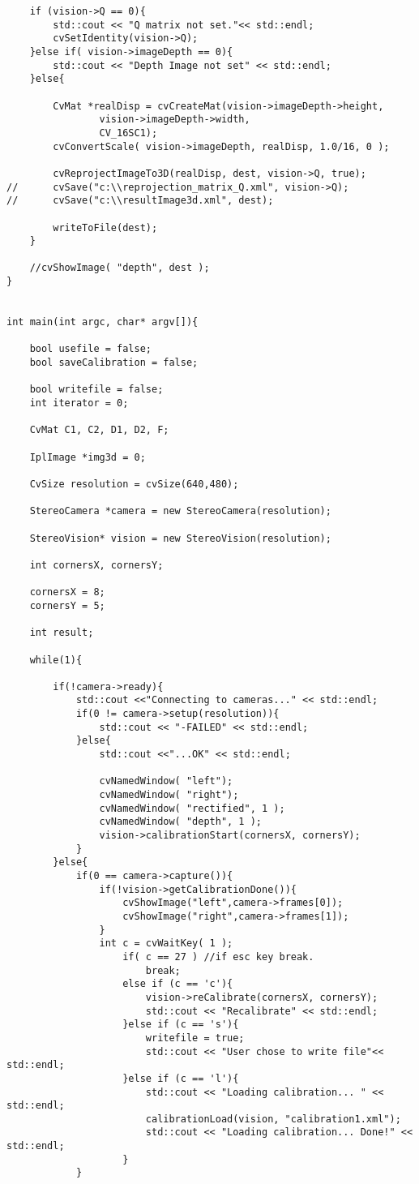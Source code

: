 \begin{lstlisting}
	if (vision->Q == 0){
		std::cout << "Q matrix not set."<< std::endl;
		cvSetIdentity(vision->Q);
	}else if( vision->imageDepth == 0){
		std::cout << "Depth Image not set" << std::endl;
	}else{

		CvMat *realDisp = cvCreateMat(vision->imageDepth->height,
				vision->imageDepth->width,
				CV_16SC1);
		cvConvertScale( vision->imageDepth, realDisp, 1.0/16, 0 );

		cvReprojectImageTo3D(realDisp, dest, vision->Q, true);
//		cvSave("c:\\reprojection_matrix_Q.xml", vision->Q);
//		cvSave("c:\\resultImage3d.xml", dest);

		writeToFile(dest);
	}

	//cvShowImage( "depth", dest );
}


int main(int argc, char* argv[]){

	bool usefile = false;
	bool saveCalibration = false;

	bool writefile = false;
	int iterator = 0;

	CvMat C1, C2, D1, D2, F;

	IplImage *img3d = 0;

	CvSize resolution = cvSize(640,480);

	StereoCamera *camera = new StereoCamera(resolution);

    StereoVision* vision = new StereoVision(resolution);

	int cornersX, cornersY;

	cornersX = 8;
	cornersY = 5;

	int result;

	while(1){

		if(!camera->ready){
			std::cout <<"Connecting to cameras..." << std::endl;
			if(0 != camera->setup(resolution)){
				std::cout << "-FAILED" << std::endl;
			}else{
				std::cout <<"...OK" << std::endl;

				cvNamedWindow( "left");
				cvNamedWindow( "right");
				cvNamedWindow( "rectified", 1 );
				cvNamedWindow( "depth", 1 );
				vision->calibrationStart(cornersX, cornersY);
			}
		}else{
			if(0 == camera->capture()){
				if(!vision->getCalibrationDone()){
					cvShowImage("left",camera->frames[0]);
					cvShowImage("right",camera->frames[1]);
				}
				int c = cvWaitKey( 1 );
					if( c == 27 ) //if esc key break.
						break;
					else if (c == 'c'){
						vision->reCalibrate(cornersX, cornersY);
						std::cout << "Recalibrate" << std::endl;
					}else if (c == 's'){
						writefile = true;
						std::cout << "User chose to write file"<< std::endl;
					}else if (c == 'l'){
						std::cout << "Loading calibration... " << std::endl;
						calibrationLoad(vision, "calibration1.xml");
						std::cout << "Loading calibration... Done!" << std::endl;
					}
			}



\end{lstlisting}
